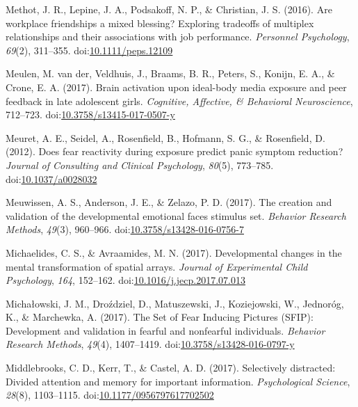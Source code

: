 \documentclass[english,man]{apa6}
\begin{document}
\hypertarget{ref-Methot2016}{}
Methot, J. R., Lepine, J. A., Podsakoff, N. P., \& Christian, J. S.
(2016). Are workplace friendships a mixed blessing? Exploring tradeoffs
of multiplex relationships and their associations with job performance.
\emph{Personnel Psychology}, \emph{69}(2), 311--355.
doi:\href{https://doi.org/10.1111/peps.12109}{10.1111/peps.12109}

\hypertarget{ref-VanderMeulen2017}{}
Meulen, M. van der, Veldhuis, J., Braams, B. R., Peters, S., Konijn, E.
A., \& Crone, E. A. (2017). Brain activation upon ideal-body media
exposure and peer feedback in late adolescent girls. \emph{Cognitive,
Affective, \& Behavioral Neuroscience}, 712--723.
doi:\href{https://doi.org/10.3758/s13415-017-0507-y}{10.3758/s13415-017-0507-y}

\hypertarget{ref-Meuret2012}{}
Meuret, A. E., Seidel, A., Rosenfield, B., Hofmann, S. G., \&
Rosenfield, D. (2012). Does fear reactivity during exposure predict
panic symptom reduction? \emph{Journal of Consulting and Clinical
Psychology}, \emph{80}(5), 773--785.
doi:\href{https://doi.org/10.1037/a0028032}{10.1037/a0028032}

\hypertarget{ref-Meuwissen2017}{}
Meuwissen, A. S., Anderson, J. E., \& Zelazo, P. D. (2017). The creation
and validation of the developmental emotional faces stimulus set.
\emph{Behavior Research Methods}, \emph{49}(3), 960--966.
doi:\href{https://doi.org/10.3758/s13428-016-0756-7}{10.3758/s13428-016-0756-7}

\hypertarget{ref-Michaelides2017}{}
Michaelides, C. S., \& Avraamides, M. N. (2017). Developmental changes
in the mental transformation of spatial arrays. \emph{Journal of
Experimental Child Psychology}, \emph{164}, 152--162.
doi:\href{https://doi.org/10.1016/j.jecp.2017.07.013}{10.1016/j.jecp.2017.07.013}

\hypertarget{ref-Michaowski2016}{}
Michałowski, J. M., Droździel, D., Matuszewski, J., Koziejowski, W.,
Jednoróg, K., \& Marchewka, A. (2017). The Set of Fear Inducing Pictures
(SFIP): Development and validation in fearful and nonfearful
individuals. \emph{Behavior Research Methods}, \emph{49}(4), 1407--1419.
doi:\href{https://doi.org/10.3758/s13428-016-0797-y}{10.3758/s13428-016-0797-y}

\hypertarget{ref-Middlebrooks2017}{}
Middlebrooks, C. D., Kerr, T., \& Castel, A. D. (2017). Selectively
distracted: Divided attention and memory for important information.
\emph{Psychological Science}, \emph{28}(8), 1103--1115.
doi:\href{https://doi.org/10.1177/0956797617702502}{10.1177/0956797617702502}
\end{document}

